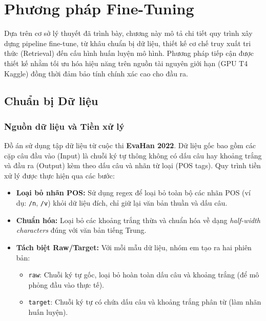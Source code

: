 \chapter{Phương pháp Fine-Tuning}
\label{chap:methodology}

Dựa trên cơ sở lý thuyết đã trình bày, chương này mô tả chi tiết quy trình xây dựng pipeline fine-tune, từ khâu chuẩn bị dữ liệu, thiết kế cơ chế truy xuất tri thức (Retrieval) đến cấu hình huấn luyện mô hình. Phương pháp tiếp cận được thiết kế nhằm tối ưu hóa hiệu năng trên nguồn tài nguyên giới hạn (GPU T4 Kaggle) đồng thời đảm bảo tính chính xác cao cho đầu ra.

\section{Chuẩn bị Dữ liệu}

\subsection{Nguồn dữ liệu và Tiền xử lý}
Đồ án sử dụng tập dữ liệu từ cuộc thi \textbf{EvaHan 2022}. Dữ liệu gốc bao gồm các cặp câu đầu vào (Input) là chuỗi ký tự thông không có dấu câu hay khoảng trắng và đầu ra (Output) kèm theo dấu câu và nhãn từ loại (POS tags). Quy trình tiền xử lý được thực hiện qua các bước:
\begin{itemize}
    \item \textbf{Loại bỏ nhãn POS:} Sử dụng regex để loại bỏ toàn bộ các nhãn POS (ví dụ: \texttt{/n}, \texttt{/v}) khỏi dữ liệu đích, chỉ giữ lại văn bản thuần và dấu câu.
    \item \textbf{Chuẩn hóa:} Loại bỏ các khoảng trắng thừa và chuẩn hóa về dạng \textit{half-width characters} đúng với văn bản tiếng Trung.
    \item \textbf{Tách biệt Raw/Target:} Với mỗi mẫu dữ liệu, nhóm em tạo ra hai phiên bản:
    \begin{itemize}
        \item \texttt{raw}: Chuỗi ký tự gốc, loại bỏ hoàn toàn dấu câu và khoảng trắng (để mô phỏng đầu vào thực tế).
        \item \texttt{target}: Chuỗi ký tự có chứa dấu câu và khoảng trắng phân từ (làm nhãn huấn luyện).
    \end{itemize}
\end{itemize}


